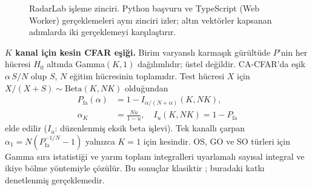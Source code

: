 \documentclass[conference,a4paper,10pt]{IEEEtran}
\newcommand{\Pfa}{P_{\mathrm{fa}}}
\begin{document}
\begin{figure}[!t]
\centering
{}
\caption{RadarLab işleme zinciri. Python başvuru ve TypeScript (Web Worker) gerçeklemeleri aynı zinciri izler; altın vektörler kapsanan adımlarda iki gerçeklemeyi karşılaştırır.}
\label{fig:chain}
\end{figure}

\textbf{$K$ kanal için kesin CFAR eşiği.} Birim varyanslı karmaşık gürültüde $P$'nin her hücresi $H_0$ altında Gamma$(K,1)$ dağılımlıdır; üstel değildir. CA-CFAR'da eşik $\alpha\,S/N$ olup $S$, $N$ eğitim hücresinin toplamıdır. Test hücresi $X$ için $X/(X+S)\sim\mathrm{Beta}(K,NK)$ olduğundan
\begin{equation}
\begin{aligned}
\Pfa(\alpha)&=1-I_{\alpha/(N+\alpha)}(K,NK),\\
\alpha_K&=\frac{Nu}{1-u},\quad I_u(K,NK)=1-\Pfa
\end{aligned}
\label{eq:alpha}
\end{equation}
elde edilir ($I_u$: düzenlenmiş eksik beta işlevi). Tek kanallı çarpan $\alpha_1=N(\Pfa^{-1/N}-1)$ yalnızca $K=1$ için kesindir. OS, GO ve SO türleri için Gamma sıra istatistiği ve yarım toplam integralleri uyarlamalı sayısal integral ve ikiye bölme yöntemiyle çözülür. Bu sonuçlar klasiktir \cite{shor1991performances,ritcey1990detection}; buradaki katkı denetlenmiş gerçeklemedir.
\end{document}
